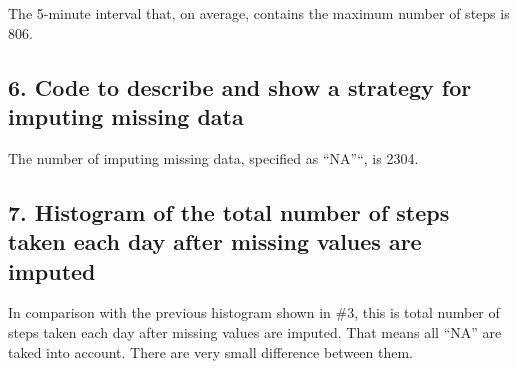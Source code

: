 \documentclass[]{article}
\newenvironment{Shaded}{\begin{snugshade}}{\end{snugshade}}
\newcommand{\KeywordTok}[1]{\textcolor[rgb]{0.13,0.29,0.53}{\textbf{#1}}}
\newcommand{\DataTypeTok}[1]{\textcolor[rgb]{0.13,0.29,0.53}{#1}}
\newcommand{\DecValTok}[1]{\textcolor[rgb]{0.00,0.00,0.81}{#1}}
\newcommand{\StringTok}[1]{\textcolor[rgb]{0.31,0.60,0.02}{#1}}
\newcommand{\OperatorTok}[1]{\textcolor[rgb]{0.81,0.36,0.00}{\textbf{#1}}}
\newcommand{\NormalTok}[1]{#1}
\begin{document}
\begin{Shaded}
\end{Shaded}

The 5-minute interval that, on average, contains the maximum number of
steps is 806.

\subsection{6. Code to describe and show a strategy for imputing missing
data}\label{code-to-describe-and-show-a-strategy-for-imputing-missing-data}

\begin{Shaded}
\end{Shaded}

The number of imputing missing data, specified as ``NA''``, is 2304.

\subsection{7. Histogram of the total number of steps taken each day
after missing values are
imputed}\label{histogram-of-the-total-number-of-steps-taken-each-day-after-missing-values-are-imputed}

In comparison with the previous histogram shown in \#3, this is total
number of steps taken each day after missing values are imputed. That
means all ``NA'' are taked into account. There are very small difference
between them.

\begin{Shaded}
\end{Shaded}
\end{document}
